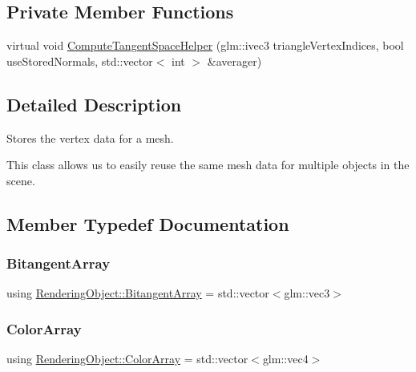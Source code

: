 \subsection*{Private Member Functions}
\begin{DoxyCompactItemize}
\item 
virtual void \hyperlink{class_rendering_object_a053e68759fe406779c6b6cfa080602bf}{Compute\+Tangent\+Space\+Helper} (glm\+::ivec3 triangle\+Vertex\+Indices, bool use\+Stored\+Normals, std\+::vector$<$ int $>$ \&averager)
\end{DoxyCompactItemize}


\subsection{Detailed Description}
Stores the vertex data for a mesh. 

This class allows us to easily reuse the same mesh data for multiple objects in the scene. 

\subsection{Member Typedef Documentation}
\hypertarget{class_rendering_object_a6c6bf305a5f0f9ce1006f374c753c856}{}\label{class_rendering_object_a6c6bf305a5f0f9ce1006f374c753c856} 
\subsubsection{\texorpdfstring{Bitangent\+Array}{BitangentArray}}
{\footnotesize\ttfamily using \hyperlink{class_rendering_object_a6c6bf305a5f0f9ce1006f374c753c856}{Rendering\+Object\+::\+Bitangent\+Array} =  std\+::vector$<$glm\+::vec3$>$}

\hypertarget{class_rendering_object_a8a12e1f9be788d99af6c089e1c600022}{}\label{class_rendering_object_a8a12e1f9be788d99af6c089e1c600022} 
\subsubsection{\texorpdfstring{Color\+Array}{ColorArray}}
{\footnotesize\ttfamily using \hyperlink{class_rendering_object_a8a12e1f9be788d99af6c089e1c600022}{Rendering\+Object\+::\+Color\+Array} =  std\+::vector$<$glm\+::vec4$>$}

